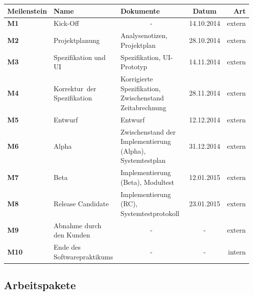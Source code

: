 \documentclass[11pt]{article}
\begin{document}
\begin{tabular}{|l|p{3.5cm}|p{3.5cm}|c|r|}
	\hline
	Meilenstein & Name & Dokumente & Datum & Art \\
	\hline \hline
	\textbf{M1} & Kick-Off & \multicolumn{1}{|c|}{-} & 14.10.2014 & extern \\
	\hline
	\textbf{M2} & Projektplanung & Analysenotizen, Projektplan & 28.10.2014 & extern \\
	\hline
	\textbf{M3} & Spezifikation und UI & Spezifikation, \mbox{UI-Prototyp} & 14.11.2014 & extern \\
	\hline
	\textbf{M4} & \mbox{Korrektur der} Spezifikation & Korrigierte Spezifikation, Zwischenstand Zeitabrechnung & 28.11.2014 & extern \\
	\hline
	\textbf{M5} & Entwurf & Entwurf & 12.12.2014 & extern \\
	\hline
	\textbf{M6} & Alpha & Zwischenstand der Implementierung (Alpha), Systemtestplan & 31.12.2014 & extern \\
	\hline
	\textbf{M7} & Beta & Implementierung (Beta), Modultest & 12.01.2015 & extern \\
	\hline
	\textbf{M8} & Release Candidate & Implementierung (RC), Systemtestprotokoll & 23.01.2015 & extern \\
	\hline
	\textbf{M9} & Abnahme durch den Kunden & \multicolumn{1}{|c|}{-} & - & extern \\
	\hline
	\textbf{M10} & Ende des Softwarepraktikums & \multicolumn{1}{|c|}{-} & - & intern \\
	\hline
\end{tabular}

\newpage

\subsection{Arbeitspakete}
\end{document}

